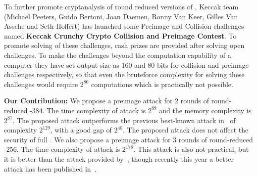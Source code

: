 \newpage
To further promote cryptanalysis of round reduced versions of \KECCAK{}, Keccak team (Michaël Peeters, Guido Bertoni, Joan Daemen, Ronny Van Keer, Gilles Van Assche and Seth Hoffert) has launched some Preimage and Collision challenges named \textbf{Keccak Crunchy Crypto Collision and Preimage Contest}. To promote solving of these challenges, cash prizes are provided after solving open challenges. To make the challenges beyond the computation capability of a computer they have set output size as 160 and 80 bits for collision and preimage challenges respectively, so that even the bruteforce complexity for solving these challenges would require $2^{80}$ computations which is practically not possible.
\newline

\textbf{Our Contribution:} We propose a preimage attack for $2$ rounds of round-reduced \KECCAK-$384$. The time complexity of attack is $2^{89}$ and the memory complexity is $2^{87}$. The proposed attack outperforms the previous best-known attack in~\cite{guo2016linear} of complexity $2^{129}$, with a good gap of $2^{40}$. The proposed attack does not affect the security of full \KECCAK{}. We also propose a preimage attack for $3$ rounds of round-reduced \KECCAK-$256$. The time complexity of attack is $2^{178}$. This attack is also not practical, but it is better than the attack provided by~\cite{guo2016linear}, though recently this year a better attack has been published in~\cite{lipreimage}.
